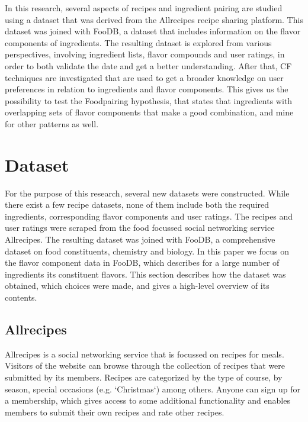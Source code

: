 In this research, several aspects of recipes and ingredient pairing are studied using a dataset that was derived from the Allrecipes recipe sharing platform.
This dataset was joined with FooDB, a dataset that includes information on the flavor components of ingredients.
The resulting dataset is explored from various perspectives, involving ingredient lists, flavor compounds and user ratings, in order to both validate the date and get a better understanding.
After that, CF techniques are investigated that are used to get a broader knowledge on user preferences in relation to ingredients and flavor components. 
This gives us the possibility to test the Foodpairing hypothesis, that states that ingredients with overlapping sets of flavor components that make a good combination, and mine for other patterns as well.




\section{Dataset}
\label{sec:dataset}

For the purpose of this research, several new datasets were constructed.
While there exist a few recipe datasets, none of them include both the required ingredients, corresponding flavor components and user ratings.
The recipes and user ratings were scraped from the food focussed social networking service Allrecipes.
The resulting dataset was joined with FooDB, a comprehensive dataset on food constituents, chemistry and biology.
In this paper we focus on the flavor component data in FooDB, which  describes for a large number of ingredients its constituent flavors.
This section describes how the dataset was obtained, which choices were made, and gives a high-level overview of its contents.


\subsection{Allrecipes}
\label{subsec:allrecipes}

Allrecipes is a social networking service that is focussed on recipes for meals.
Visitors of the website can browse through the collection of recipes that were submitted by its members.
Recipes are categorized by the type of course, by season, special occasions (e.g. `Christmas`) among others.
Anyone can sign up for a membership, which gives access to some additional functionality and enables members to submit their own recipes and rate other recipes.

